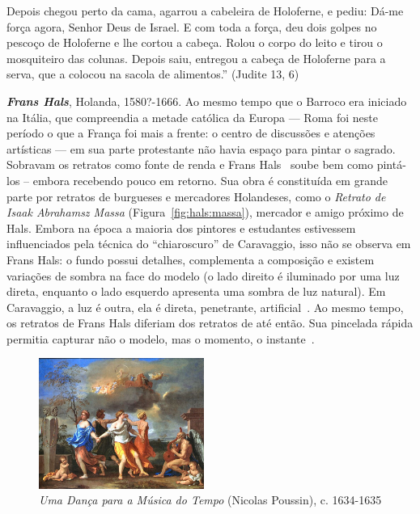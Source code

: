Depois chegou perto da cama, agarrou a cabeleira de Holoferne, e
pediu: Dá-me força agora, Senhor Deus de Israel. E com toda a força,
deu dois golpes no pescoço de Holoferne e lhe cortou a cabeça. Rolou o
corpo do leito e tirou o mosquiteiro das colunas. Depois saiu,
entregou a cabeça de Holoferne para a serva, que a colocou na sacola
de alimentos.'' (Judite 13, 6)

\textbf{\emph{Frans Hals}}, Holanda, 1580?-1666. Ao mesmo tempo que o
Barroco era iniciado na Itália, que compreendia a metade católica da
Europa --- Roma foi neste período o que a França foi mais a frente: o
centro de discussões e atenções artísticas --- em sua parte
protestante não havia espaço para pintar o sagrado.~\cite{gombrich}
Sobravam os retratos como fonte de renda e Frans Hals~\cite{grimm}
soube bem como pintá-los -- embora recebendo pouco em retorno. Sua
obra é constituída em grande parte por retratos de burgueses e
mercadores Holandeses, como o \textit{Retrato de Isaak Abrahamsz
  Massa} (Figura~\ref{fig:hals:massa}), mercador e amigo próximo de
Hals. Embora na época a maioria dos pintores e estudantes estivessem
influenciados pela técnica do ``chiaroscuro'' de Caravaggio, isso não
se observa em Frans Hals: o fundo possui detalhes, complementa a
composição e existem variações de sombra na face do modelo (o lado
direito é iluminado por uma luz direta, enquanto o lado esquerdo
apresenta uma sombra de luz natural). Em Caravaggio, a luz é outra,
ela é direta, penetrante, artificial~\cite{gombrich}. Ao mesmo tempo,
os retratos de Frans Hals diferiam dos retratos de até então. Sua
pincelada rápida permitia capturar não o modelo, mas o momento, o
instante~\cite{peter}. 

\begin{figure}
  \begin{center}
    \includegraphics[width=0.48\textwidth]{figs/poussin_danca.png}
  \end{center}
  \caption{\emph{Uma Dança para a Música do Tempo} (Nicolas Poussin), c. 1634-1635}
  \label{fig:poussin:danca}
\end{figure}


